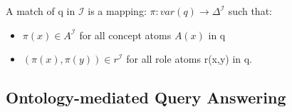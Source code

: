 \documentclass[11pt]{article}
\begin{document}
\begin{enumerate}
A match of q in $\mathcal{I}$ is a mapping: $\pi: var(q) \to 
\Delta^{\mathcal{I}}$ such that:
\begin{itemize}
  \item $\pi(x) \in A^{\mathcal{I}}$ for all concept atoms $A(x)$ in q
  \item $(\pi(x),\pi(y)) \in r^{\mathcal{I}}$ for all role atoms 
r(x,y) in q.
\end{itemize}
\end{enumerate}








\subsection{Ontology-mediated Query Answering}
\label{sec-1-2}
\end{document}
